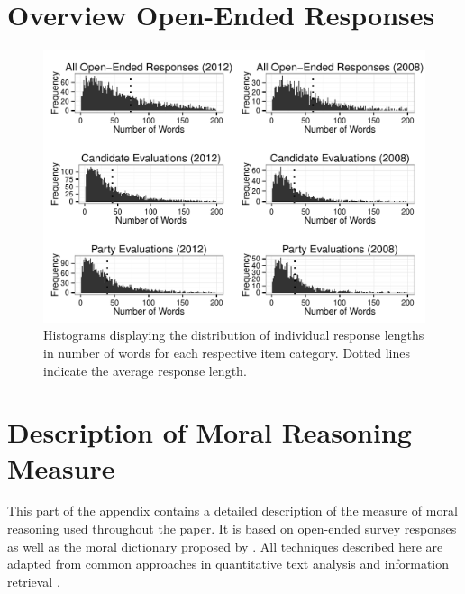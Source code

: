 \documentclass[12pt]{article}
\begin{document}
\clearpage
\section{Overview Open-Ended Responses}\label{app:oview}
\renewcommand\thefigure{\thesection.\arabic{figure}}
\renewcommand\thetable{\thesection.\arabic{table}}
\setcounter{figure}{0}
\setcounter{table}{0}



\begin{figure}[h]\centering
\includegraphics[scale=.7]{../calc/fig/appB2num.pdf}
\caption{Histograms displaying the distribution of individual response lengths in number of words for each respective item category. Dotted lines indicate the average response length.}\label{fig:appB2num}
\end{figure}

\clearpage
\section{Description of Moral Reasoning Measure}\label{app:measure}

This part of the appendix contains a detailed description of the measure of moral reasoning used throughout the paper. It is based on open-ended survey responses as well as the moral dictionary proposed by \citet{graham2009liberals}. All techniques described here are adapted from common approaches in quantitative text analysis and information retrieval \citep[see for exampe][for an introduction and from which much of the notation in this part of the appendix is adapted]{manning2008introduction}.
\end{document}
